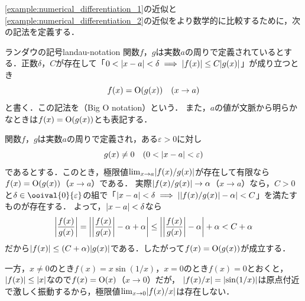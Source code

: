\documentclass[../../main]{subfiles}
\begin{document}
\cref{example:numerical_differentiation_1}の近似と\cref{example:numerical_differentiation_2}の近似をより数学的に比較するために，次の記法を定義する．

\begin{definition}{ランダウの記号}{landau-notation}
関数\(f\)，\(g\)は実数\(a\)の周りで定義されているとする．正数\(\delta\)，\(C\)が存在して「\(0<\abs{x-a}<\delta\implies\abs{f(x)}\leq C\abs{g(x)}\)」が成り立つとき
\[
  f(x) = \Order(g(x))\quad(x\to a)
\]
と書く．この記法を（Big O notation）という．
また，\(a\)の値が文脈から明らかなときは\(f(x)=\Order(g(x))\)とも表記する．
\end{definition}

\begin{example}
\label{example:bigo_ratio}
関数\(f\)，\(g\)は実数\(a\)の周りで定義され，ある\(\varepsilon>0\)に対し
\[
  g(x)\neq 0\quad(0<\abs{x-a}<\varepsilon)
\]
であるとする．このとき，極限値\(\lim_{x\to a}\abs{f(x)/g(x)}\)が存在して有限なら\(f(x)=\Order(g(x))\)（\(x\to a\)）である．
実際\(\abs{f(x)/g(x)}\to\alpha\)（\(x\to a\)）なら，\(C>0\)と\(\delta\in\ooival{0}{\varepsilon}\)の組で「\(\abs{x-a}<\delta\implies\abs{\abs{f(x)/g(x)}-\alpha}<C\)」を満たすものが存在する．
よって，\(\abs{x-a}<\delta\)なら
\[
  \abs*{\frac{f(x)}{g(x)}} = \abs*{\abs*{\frac{f(x)}{g(x)}}-\alpha+\alpha}
  \leq \abs*{\abs*{\frac{f(x)}{g(x)}}-\alpha}+\alpha
  < C+\alpha
\]
だから\(\abs{f(x)}\leq(C+\alpha)\abs{g(x)}\)である．したがって\(f(x)=\Order(g(x))\)が成立する．

一方，\(x\neq 0\)のとき\(f(x)=x\sin(1/x)\)，\(x=0\)のとき\(f(x)=0\)とおくと，\(\abs{f(x)}\leq\abs{x}\)なので\(f(x)=\Order(x)\)（\(x\to 0\)）だが，
\(\abs{f(x)/x}=\abs{\sin(1/x)}\)は原点付近で激しく振動するから，極限値\(\lim_{x\to 0}\abs{f(x)/x}\)は存在しない．
\end{example}
\end{document}
